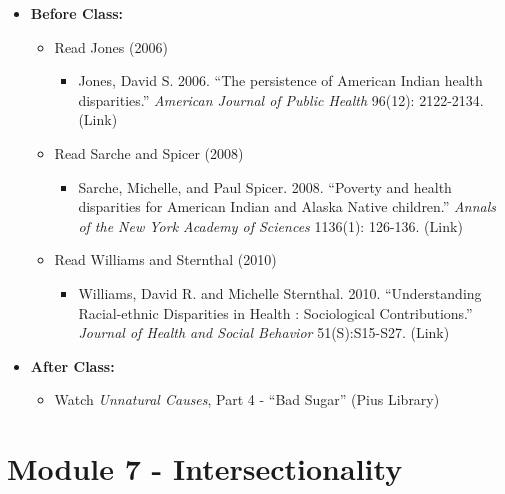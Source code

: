\documentclass[
]{book}
\providecommand{\tightlist}{%
  \setlength{\itemsep}{0pt}\setlength{\parskip}{0pt}}
\begin{document}
\begin{itemize}
\tightlist
\item
  \textbf{Before Class:}

  \begin{itemize}
  \tightlist
  \item
    Read Jones (2006)

    \begin{itemize}
    \tightlist
    \item
      Jones, David S. 2006. ``The persistence of American Indian health disparities.'' \emph{American Journal of Public Health} 96(12): 2122-2134. (Link)
    \end{itemize}
  \item
    Read Sarche and Spicer (2008)

    \begin{itemize}
    \tightlist
    \item
      Sarche, Michelle, and Paul Spicer. 2008. ``Poverty and health disparities for American Indian and Alaska Native children.'' \emph{Annals of the New York Academy of Sciences} 1136(1): 126-136. (Link)
    \end{itemize}
  \item
    Read Williams and Sternthal (2010)

    \begin{itemize}
    \tightlist
    \item
      Williams, David R. and Michelle Sternthal. 2010. ``Understanding Racial-ethnic Disparities in Health : Sociological Contributions.'' \emph{Journal of Health and Social Behavior} 51(S):S15-S27. (Link)
    \end{itemize}
  \end{itemize}
\item
  \textbf{After Class:}

  \begin{itemize}
  \tightlist
  \item
    Watch \emph{Unnatural Causes}, Part 4 - ``Bad Sugar'' (Pius Library)
  \end{itemize}
\end{itemize}

\newpage

\hypertarget{module-7---intersectionality}{%
\section{Module 7 - Intersectionality}\label{module-7---intersectionality}}
\end{document}

